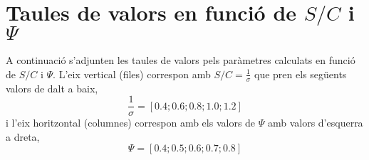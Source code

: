\section{Taules de valors en funció de $S/C$ i $\Psi$}
A continuació s'adjunten les taules de valors pels paràmetres calculats en funció de $S/C$ i $\Psi$. L'eix vertical (files) correspon amb $S/C=\frac{1}{\sigma}$ que pren els següents valors de dalt a baix,
\begin{equation}
\nonumber \frac{1}{\sigma}=[0.4; 0.6; 0.8; 1.0; 1.2]
\end{equation}
i l'eix horitzontal (columnes) correspon amb els valors de $\Psi$ amb valors d'esquerra a dreta,
\begin{equation}
\nonumber \Psi=[0.4;0.5;0.6;0.7;0.8]
\end{equation}

